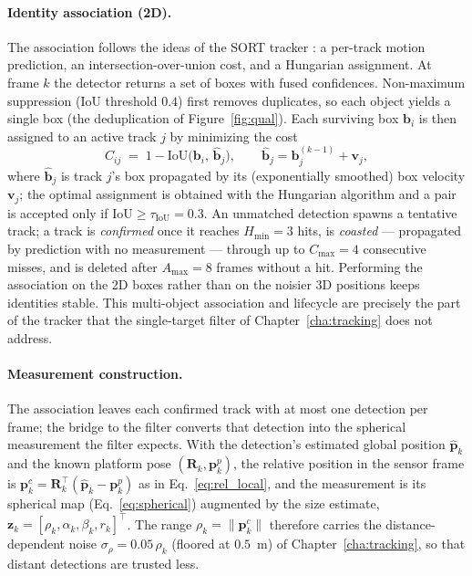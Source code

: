 \paragraph*{Identity association (2D).} The association follows the ideas of the
SORT tracker \cite{bewley2016sort}: a per-track motion prediction, an
intersection-over-union cost, and a Hungarian assignment. At frame $k$ the
detector returns a set of boxes with fused confidences. Non-maximum suppression
(IoU threshold $0.4$) first removes duplicates, so each object yields a single box
(the deduplication of Figure~\ref{fig:qual}). Each surviving box $\bm{b}_i$ is then assigned to an active
track $j$ by minimizing the cost
\begin{equation}
  C_{ij} \;=\; 1 - \mathrm{IoU}\!\big(\bm{b}_i,\,\hat{\bm{b}}_j\big),
  \qquad
  \hat{\bm{b}}_j = \bm{b}_j^{(k-1)} + \bm{v}_j,
  \label{eq:assoc_cost}
\end{equation}
where $\hat{\bm{b}}_j$ is track $j$'s box propagated by its (exponentially smoothed)
box velocity $\bm{v}_j$; the optimal assignment is obtained with the Hungarian
algorithm and a pair is accepted only if $\mathrm{IoU}\ge\tau_{\mathrm{IoU}}=0.3$.
An unmatched detection spawns a tentative track; a track is \emph{confirmed} once it
reaches $H_{\min}=3$ hits, is \emph{coasted} --- propagated by prediction with no
measurement --- through up to $C_{\max}=4$ consecutive misses, and is deleted after
$A_{\max}=8$ frames without a hit. Performing the association on the 2D boxes rather
than on the noisier 3D positions keeps identities stable. This multi-object
association and lifecycle are precisely the part of the tracker that the
single-target filter of Chapter~\ref{cha:tracking} does not address.

\paragraph*{Measurement construction.} The association leaves each confirmed track
with at most one detection per frame; the bridge to the filter converts that
detection into the spherical measurement the filter expects. With the detection's
estimated global position $\hat{\bm{p}}_k$ and the known platform pose
$(\bm{R}_k,\bm{p}^p_k)$, the relative position in the sensor frame is
$\bm{p}^c_k=\bm{R}_k^{\top}(\hat{\bm{p}}_k-\bm{p}^p_k)$ as in
Eq.~\eqref{eq:rel_local}, and the measurement is its spherical map
(Eq.~\eqref{eq:spherical}) augmented by the size estimate,
$\bm{z}_k=[\rho_k,\alpha_k,\beta_k,r_k]^{\top}$. The range $\rho_k=\lVert\bm{p}^c_k\rVert$
therefore carries the distance-dependent noise $\sigma_\rho=0.05\,\rho_k$ (floored at
$0.5$~m) of Chapter~\ref{cha:tracking}, so that distant detections are trusted less.

